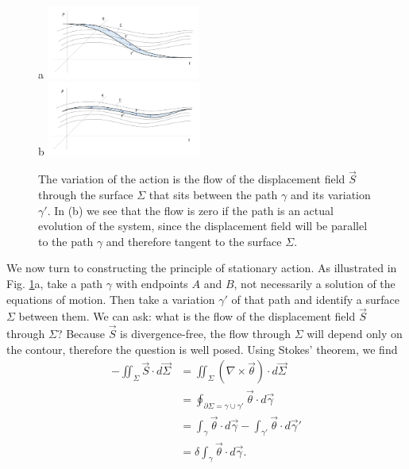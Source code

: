 \documentclass[fleqn,10pt]{wlscirep}
\begin{document}
\begin{figure}
	a \includegraphics[width = 0.45\textwidth]{ActionNonOptimized.png} \\
	b \includegraphics[width = 0.45\textwidth]{ActionOptimized.png}
	\caption{\footnotesize{The variation of the action is the flow of the displacement field $\vec{S}$ through the surface $\Sigma$ that sits between the path $\gamma$ and its variation $\gamma'$. In (b) we see that the flow is zero if the path is an actual evolution of the system, since the displacement field will be parallel to the path $\gamma$ and therefore tangent to the surface $\Sigma$.}}\label{fig_action}
\end{figure}

We now turn to constructing the principle of stationary action. As illustrated in Fig. \ref{fig_action}a, take a path $\gamma$ with endpoints $A$ and $B$, not necessarily a solution of the equations of motion. Then take a variation $\gamma'$ of that path and identify a surface $\Sigma$ between them. We can ask: what is the flow of the displacement field $\vec{S}$ through $\Sigma$? Because $\vec{S}$ is divergence-free, the flow through $\Sigma$ will depend only on the contour, therefore the question is well posed. Using Stokes' theorem, we find
\begin{equation}\label{sdof_action}
	\begin{aligned}
		- \iint_{\Sigma} \vec{S} \cdot d\vec{\Sigma} &= \iint_{\Sigma} \left( \nabla \times \vec{\theta} \right) \cdot d\vec{\Sigma} \\
		&=  \oint_{\partial \Sigma = \gamma \cup \gamma'} \vec{\theta}  \cdot d\vec{\gamma}  \\
		&= \int_{\gamma} \vec{\theta} \cdot d\vec{\gamma} - \int_{\gamma'} \vec{\theta} \cdot d\vec{\gamma}' \\
		&= \delta \int_{\gamma} \vec{\theta} \cdot d\vec{\gamma}.
	\end{aligned}
\end{equation}
\end{document}
